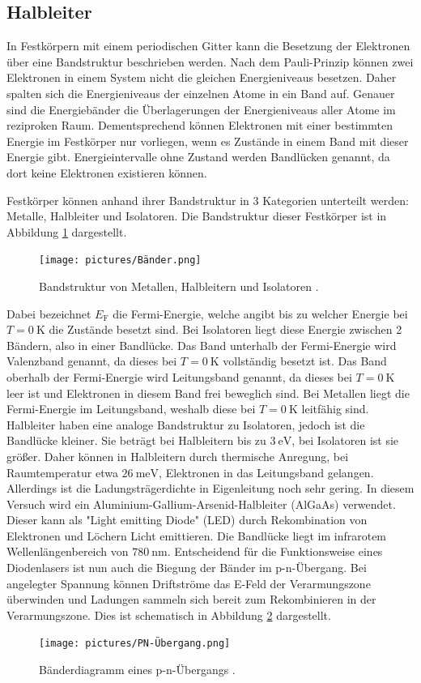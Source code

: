 \subsection{Halbleiter}
In Festkörpern mit einem periodischen Gitter kann die Besetzung der Elektronen über eine Bandstruktur beschrieben werden.
Nach dem Pauli-Prinzip können zwei Elektronen in einem System nicht die gleichen Energieniveaus besetzen. Daher spalten sich 
die Energieniveaus der einzelnen Atome in ein Band auf. Genauer sind die Energiebänder die Überlagerungen der Energieniveaus aller Atome im 
reziproken Raum. Dementsprechend können Elektronen mit einer bestimmten Energie im Festkörper nur vorliegen, wenn es Zustände in einem Band mit dieser 
Energie gibt. Energieintervalle ohne Zustand werden Bandlücken genannt, da dort keine Elektronen existieren können.

\noindent Festkörper können anhand ihrer Bandstruktur in 3 Kategorien unterteilt werden: Metalle, Halbleiter und Isolatoren.
Die Bandstruktur dieser Festkörper ist in Abbildung \ref{fig:Band} dargestellt.
\begin{figure}[H]
    \centering
    \texttt{[image: pictures/Bänder.png]}
    \caption{Bandstruktur von Metallen, Halbleitern und Isolatoren \cite{demtröder}.}
    \label{fig:Band}
\end{figure}
\noindent Dabei bezeichnet $E_\text{F}$ die Fermi-Energie, welche angibt bis zu welcher Energie bei $T=\qty{0}{\kelvin}$ die Zustände besetzt sind.
Bei Isolatoren liegt diese Energie zwischen 2 Bändern, also in einer Bandlücke. Das Band unterhalb der Fermi-Energie wird Valenzband genannt, 
da dieses bei $T=\qty{0}{\kelvin}$ vollständig besetzt ist. Das Band oberhalb der Fermi-Energie wird Leitungsband genannt, da dieses bei $T=\qty{0}{\kelvin}$ leer ist und 
Elektronen in diesem Band frei beweglich sind. Bei Metallen liegt die Fermi-Energie im Leitungsband, weshalb diese bei $T=\qty{0}{\kelvin}$ leitfähig sind.
Halbleiter haben eine analoge Bandstruktur zu Isolatoren, jedoch ist die Bandlücke kleiner. Sie beträgt bei Halbleitern bis zu $\qty{3}{\eV}$, bei Isolatoren 
ist sie größer. Daher können in Halbleitern durch thermische Anregung, bei Raumtemperatur etwa $\qty{26}{\milli\eV}$, Elektronen in das Leitungsband gelangen. 
Allerdings ist die Ladungsträgerdichte in Eigenleitung noch sehr gering. In diesem Versuch wird ein Aluminium-Gallium-Arsenid-Halbleiter (AlGaAs) verwendet. Dieser kann als "Light emitting Diode" (LED)
durch Rekombination von Elektronen und Löchern Licht emittieren. Die Bandlücke liegt im infrarotem Wellenlängenbereich von $\qty{780}{\nano\meter}$.
Entscheidend für die Funktionsweise eines Diodenlasers ist nun auch die Biegung der Bänder im p-n-Übergang. Bei angelegter Spannung können 
Driftströme das E-Feld der Verarmungszone überwinden und Ladungen sammeln sich bereit zum Rekombinieren in der Verarmungszone.
Dies ist schematisch in Abbildung \ref{fig:PN} dargestellt. 
\begin{figure}[H]
    \centering
    \texttt{[image: pictures/PN-Übergang.png]}
    \caption{Bänderdiagramm eines p-n-Übergangs \cite{Demtröder}.}
    \label{fig:PN}
\end{figure}
